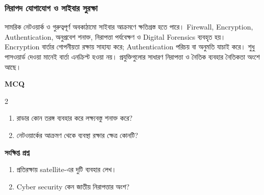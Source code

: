 \subsubsection{নিরাপদ যোগাযোগ ও সাইবার সুরক্ষা}
সামরিক নেটওয়ার্ক ও গুরুত্বপূর্ণ অবকাঠামো সাইবার আক্রমণে ক্ষতিগ্রস্ত হতে পারে। Firewall, Encryption, Authentication, অনুপ্রবেশ শনাক্ত, নিরাপত্তা পর্যবেক্ষণ ও Digital Forensics ব্যবহৃত হয়। Encryption বার্তার গোপনীয়তা রক্ষায় সাহায্য করে; Authentication পরিচয় বা অনুমতি যাচাই করে। শুধু পাসওয়ার্ড দেওয়া মানেই বার্তা এনক্রিপ্ট হওয়া নয়। প্রযুক্তিগুলোর সাধারণ নিরাপত্তা ও নৈতিক ব্যবহার নৈতিকতা অংশে আছে।
\begin{practicebox}
\textbf{MCQ}
\begin{multicols}{2}\begin{enumerate}
\item \begin{minipage}[t]{\linewidth}রাডার কোন তরঙ্গ ব্যবহার করে লক্ষ্যবস্তু শনাক্ত করে?\par {}\par\end{minipage}
\item \begin{minipage}[t]{\linewidth}নেটওয়ার্কের আক্রমণ থেকে ব্যবস্থা রক্ষার ক্ষেত্র কোনটি?\par {}\par\end{minipage}
\end{enumerate}\end{multicols}

\textbf{সংক্ষিপ্ত প্রশ্ন}
\begin{enumerate}
\item প্রতিরক্ষায় satellite-এর দুটি ব্যবহার লেখ।
\item Cyber security কেন জাতীয় নিরাপত্তার অংশ?
\end{enumerate}
\end{practicebox}

